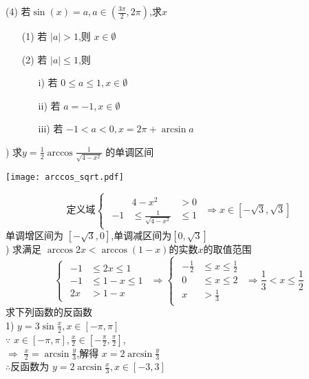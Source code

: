 \documentclass{article}
\newcommand \row[1]{$\displaystyle #1$}
\begin{document}
\noindent 
(4) 若\row{\sin(x)=a,a\in\left(\frac{3\pi}{2},2\pi\right)},求$x$
\begin{enumerate}
\item[(1)]若 $|a|>1$,则 $x\in \emptyset$
\item[(2)] 若 $|a|\le 1$,则
\begin{enumerate}
\item[i)] 若 $0\le a\le 1,x\in \emptyset$
\item[ii)] 若 $a=-1,x\in \emptyset$
\item[iii)] 若 $-1<a<0,x=2\pi+\arcsin{a}$
\end{enumerate}
\end{enumerate}

)
求\row{y=\frac{1}{2}\arccos{\frac{1}{\sqrt{4-x^2}}}} 的单调区间 \\
\begin{center}
\texttt{[image: arccos\_sqrt.pdf]}
\end{center}
\begin{equation*}
\text{定义域}
\begin{cases}
\begin{split}
&4-x^2&>0 \\
-1&\le \frac{1}{\sqrt{4-x^2}}&\le 1
\end{split}
\end{cases}
\Longrightarrow  x\in [-\sqrt{3},\sqrt{3}]
\end{equation*}
单调增区间为 $\displaystyle [-\sqrt{3},0]$,单调减区间为\row{[0,\sqrt{3}]}\\
) 求满足 $\arccos{2x}<\arccos{(1-x)}$的实数$x$的取值范围 \\
\begin{equation*}
\begin{cases}
\begin{split}
-1&\le 2x \le  1 \\
-1&\le 1-x\le 1 \\
2x &>1-x 
\end{split}
\end{cases}
\Longrightarrow
\begin{cases}
\begin{split}
-\frac{1}{2}& \le x \le\frac{1}{2} \\
0& \le x \le 2 \\
x& > \frac{1}{3}
\end{split}
\end{cases}
\Longrightarrow  \frac{1}{3}< x \le \frac{1}{2}
\end{equation*}
 求下列函数的反函数\\
1) \row{y=3\sin{\frac{x}{2}},x\in[-\pi,\pi]} \\ 
$\because$ \row{x\in[-\pi,\pi],\frac{x}{2}\in [-\frac{\pi}{2},\frac{\pi}{2}]},\\
$\Longrightarrow$ $\displaystyle \frac{x}{2}=\arcsin{\frac{y}{3}}$,解得
\row{x=2\arcsin{\frac{y}{3}}} \\
$\therefore$反函数为 \row{y=2\arcsin{\frac{x}{3}},x\in[-3,3]} \\
\end{document}
